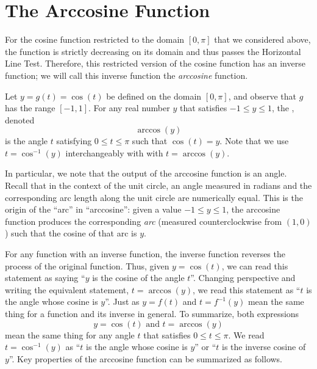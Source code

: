 \documentclass{ximera}
\begin{document}
\section{The Arccosine Function}

For the cosine function restricted to the domain $[0,\pi]$ that we considered above, the function is strictly decreasing on its domain and thus passes the Horizontal Line Test. Therefore, this restricted version of the cosine function has an inverse function; we will call this inverse function the \emph{arccosine} function.%

\begin{definition}
Let $y = g(t) = \cos(t)$ be defined on the domain $[0,\pi]$, and observe that $g$ has the range $[-1,1]$.  For any real number $y$ that satisfies $-1 \leq y \leq 1$, the , denoted%
\begin{equation*}
\arccos(y)
\end{equation*}
is the angle $t$ satisfying $0 \leq t \leq \pi$ such that $\cos(t) = y$.
%
Note that we use $t=\cos^{-1}(y)$ interchangeably with with $t = \arccos(y)$.
\end{definition}

In particular, we note that the output of the arccosine function is an angle. Recall that in the context of the unit circle, an angle measured in radians and the corresponding arc length along the unit circle are numerically equal. This is the origin of the ``arc'' in ``arccosine'': given a value $-1 \leq y \leq 1$, the arccosine function produces the corresponding \emph{arc} (measured counterclockwise from $(1,0)$) such that the cosine of that arc is $y$.%
\par
For any function with an inverse function, the inverse function reverses the process of the original function. Thus, given $y = \cos(t)$, we can read this statement as saying ``$y$ is the cosine of the angle $t$''.  Changing perspective and writing the equivalent statement, $t = \arccos(y)$, we read this statement as ``$t$ is the angle whose cosine is $y$''.  Just as $y = f(t)$ and $t = f^{-1}(y)$ mean the same thing for a function and its inverse in general. 
To summarize, both expressions
\begin{equation*}
y = \cos(t) \text{ and } t = \arccos(y)
\end{equation*}
mean the same thing for any angle $t$ that satisfies $0 \leq t \leq \pi$.  
We read $t = \cos^{-1}(y)$ as ``$t$ is the angle whose cosine is $y$'' or ``$t$ is the inverse cosine of $y$''.  Key properties of the arccosine function can be summarized as follows.%
\end{document}
